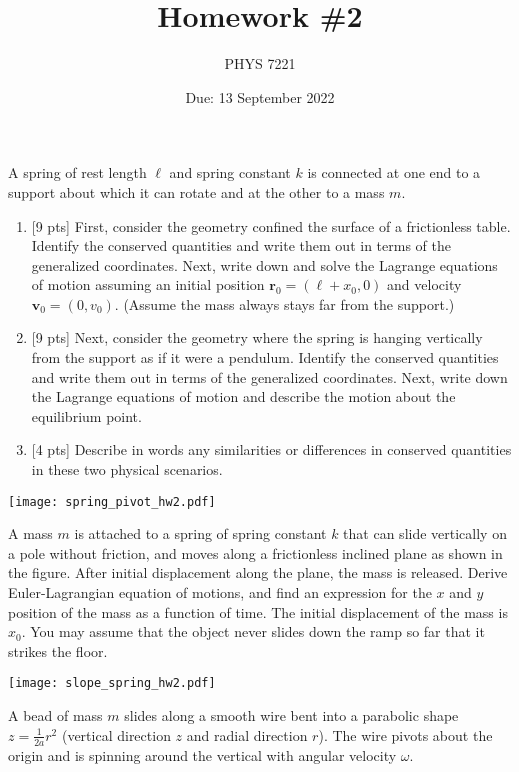 \documentclass{jhwhw}
\author{PHYS 7221}
\title{Homework \#2}
\date{Due: 13 September 2022}
\begin{document}

A spring of rest length $\ell$ and spring constant $k$ is connected at one end to a support about which it can rotate and at the other to a mass $m$.

\begin{enumerate}
  \item {[9 pts]} First, consider the geometry confined the surface of a frictionless table. Identify the conserved quantities and write them out in terms of the generalized coordinates. Next, write down and solve the Lagrange equations of motion assuming an initial position $\mathbf r_{0} = (\ell + x_{0}, 0)$ and velocity $\mathbf v_{0} = (0, v_{0})$. (Assume the mass always stays far from the support.)
  \item {[9 pts]} Next, consider the geometry where the spring is hanging vertically from the support as if it were a pendulum. Identify the conserved quantities and write them out in terms of the generalized coordinates. Next, write down the Lagrange equations of motion and describe the motion about the equilibrium point.
  \item {[4 pts]} Describe in words any similarities or differences in conserved quantities in these two physical scenarios.
\end{enumerate}
\begin{center}
  \texttt{[image: spring\_pivot\_hw2.pdf]}
\end{center}


A mass $m$ is attached to a spring of spring constant $k$ that can slide vertically on a pole without friction, and moves along a frictionless inclined plane as shown in the figure. After initial displacement along the plane, the mass is released. Derive Euler-Lagrangian equation of motions, and find an expression for the $x$ and $y$ position of the mass as a function of time. The initial displacement of the mass is $x_{0}$. You may assume that the object never slides down the ramp so far that it strikes the floor.
\begin{center}
\texttt{[image: slope\_spring\_hw2.pdf]}
\end{center}


A bead of mass $m$ slides along a smooth wire bent into a parabolic shape $z = \frac1{2a}r^{2}$ (vertical direction $z$ and radial direction $r$). The wire pivots about the origin and is spinning around the vertical with angular velocity $\omega$.
\end{document}
